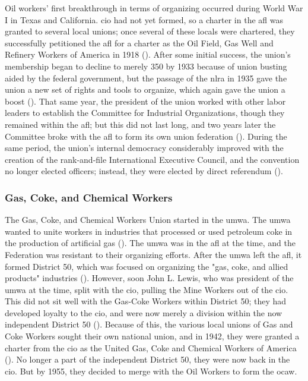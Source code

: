 \documentclass[12pt]{article}
\begin{document}
Oil workers’ first breakthrough in terms of organizing occurred during World War I in Texas and California. \acrfull{cio} had not yet formed, so a charter in the \acrfull{afl} was granted to several local unions; once several of these locals were chartered, they successfully petitioned the \acrshort{afl} for a charter as the Oil Field, Gas Well and Refinery Workers of America in 1918 (\cite[48]{ocawFactBookOil1960}). After some initial success, the union’s membership began to decline to merely 350 by 1933 because of union busting aided by the federal government, but the passage of the \acrfull{nlra} in 1935 gave the union a new set of rights and tools to organize, which again gave the union a boost (\cite[49]{ocawFactBookOil1960}). That same year, the president of the union worked with other labor leaders to establish the Committee for Industrial Organizations, though they remained within the \acrshort{afl}; but this did not last long, and two years later the Committee broke with the \acrshort{afl} to form its own union federation (\cite[49]{ocawFactBookOil1960}). During the same period, the union’s internal democracy considerably improved with the creation of the rank-and-file International Executive Council, and the convention no longer elected officers; instead, they were elected by direct referendum (\cite[49--50]{ocawFactBookOil1960}).

\subsubsection{Gas, Coke, and Chemical Workers}

The Gas, Coke, and Chemical Workers Union started in the \acrfull{umwa}. The \acrshort{umwa} wanted to unite workers in industries that processed or used petroleum coke in the production of artificial gas (\cite[50]{ocawFactBookOil1960}). The \acrshort{umwa} was in the \acrshort{afl} at the time, and the Federation was resistant to their organizing efforts. After the \acrshort{umwa} left the \acrshort{afl}, it formed District 50, which was focused on organizing the "gas, coke, and allied products" industries (\cite[50--51]{ocawFactBookOil1960}). However, soon John L. Lewis, who was president of the \acrshort{umwa} at the time, split with the \acrshort{cio}, pulling the Mine Workers out of the \acrshort{cio}. This did not sit well with the Gas-Coke Workers within District 50; they had developed loyalty to the \acrshort{cio}, and were now merely a division within the now independent District 50 (\cite[51]{ocawFactBookOil1960}). Because of this, the various local unions of Gas and Coke Workers sought their own national union, and in 1942, they were granted a charter from the \acrshort{cio} as the United Gas, Coke and Chemical Workers of America (\cite[51]{ocawFactBookOil1960}). No longer a part of the independent District 50, they were now back in the \acrshort{cio}. But by 1955, they decided to merge with the Oil Workers to form the \acrfull{ocaw}.
\end{document}
